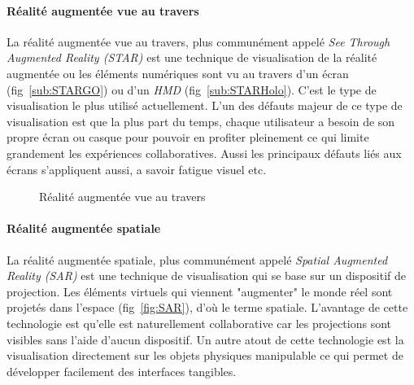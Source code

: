 \paragraph{Réalité augmentée vue au travers}
La réalité augmentée vue au travers, plus communément appelé \emph{See Through Augmented Reality (STAR)} est une technique de visualisation de la réalité augmentée ou les éléments numériques sont vu au travers d'un écran (fig~\ref{sub:STARGO}) ou d'un \emph{HMD} (fig~\ref{sub:STARHolo}). C'est le type de visualisation le plus  utilisé actuellement. L'un des défauts majeur de ce type de visualisation est que la plus part du temps, chaque utilisateur a besoin de son propre écran ou casque pour pouvoir en profiter pleinement ce qui limite grandement les expériences collaboratives. Aussi les principaux défauts liés aux écrans s'appliquent aussi, a savoir fatigue visuel etc.  

\begin{figure}[h]
    \centering
\caption{Réalité augmentée vue au travers}
\label{fig:STAR}
\end{figure}


\paragraph{Réalité augmentée spatiale}
La réalité augmentée spatiale, plus communément appelé \emph{Spatial Augmented Reality (SAR)} est une technique de visualisation qui se base sur un dispositif de projection. Les éléments virtuels qui viennent "augmenter" le monde réel sont projetés dans l'espace (fig~\ref{fig:SAR}), d'où le terme spatiale. L'avantage de cette technologie est qu'elle est naturellement collaborative car les projections sont visibles sans l'aide d'aucun dispositif. Un autre atout de cette technologie est la visualisation directement sur les objets physiques manipulable ce qui permet de développer facilement des interfaces tangibles.

